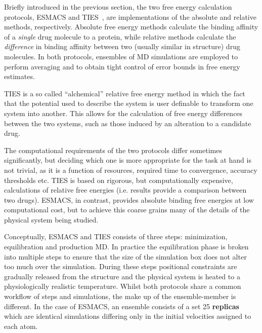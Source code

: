  
Briefly introduced in the previous section, the two free energy calculation 
protocols, ESMACS and TIES~\cite{Wan2017brd4, Bhati2017}, are 
implementations of the absolute and relative methods, respectively. 
Absolute free energy methods calculate the binding affinity of a \emph{single} 
drug molecule to a protein, while relative methods calculate the 
\emph{difference} in binding affinity between two (usually similar in structure) 
drug molecules. In both protocols, ensembles of MD simulations are employed to 
perform averaging and to obtain tight control of error bounds in free energy 
estimates.



TIES is a so called ``alchemical'' relative free energy method 
in which the fact that the potential used to describe the system is user 
definable to transform one system into another. This allows for the calculation 
of free energy differences between the two systems, such as those induced by an 
alteration to a candidate drug. 

The computational requirements of the two protocols differ sometimes 
significantly, but deciding which one is more appropriate for the task at hand 
is not trivial, as it is a function of resources, required time to convergence, 
accuracy thresholds etc. TIES is based on rigorous, but computationally 
expensive, calculations of relative free energies (i.e. results provide a 
comparison between two drugs). ESMACS, in contrast, provides absolute binding 
free energies at low computational cost, but to achieve this coarse grains many 
of the details of the physical system being studied. 

Conceptually, ESMACS and TIES consists of three steps: minimization, 
equilibration and production MD. In practice the equilibration phase is broken 
into multiple steps to ensure that the size of the simulation box does not alter 
too much over the simulation. During these steps positional constraints are 
gradually released from the structure and the physical system is heated to a 
physiologically realistic temperature. Whilst both protocols share a common 
workflow of steps and simulations, the make up of the ensemble-member is 
different. In the case of ESMACS, an ensemble consists of a set 25 
\textbf{replicas} which are identical simulations differing only in the initial 
velocities assigned to each atom. 

